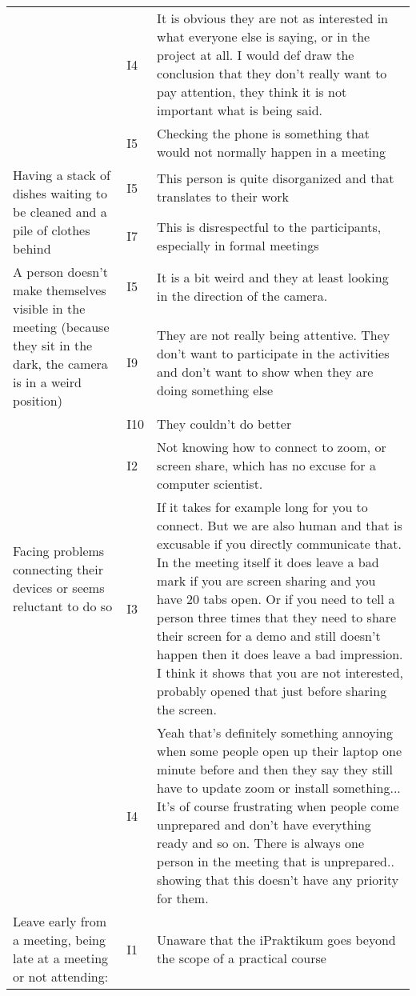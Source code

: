 \begin{longtable}[ht]{ p{}   p{}  p{} }
    & I4 & It is obvious they are not as interested in what everyone else is saying, or in the project at all. I would def draw the conclusion that they don't really want to pay attention, they think it is not important what is being said. \\
 	& I5 & Checking the phone is something that would not normally happen in a meeting \\
    \hline
    \multirow{2}{4cm}{Having a stack of dishes waiting to be cleaned and a pile of clothes behind} & I5 & This person is quite disorganized and that translates to their work \\
    & I7 & This is disrespectful to the participants, especially in formal meetings \\
    \hline
    \multirow{2}{4cm}{A person doesn’t make themselves visible in the meeting (because they sit in the dark, the camera is in a weird position)} & I5 & It is a bit weird and they at least looking in the direction of the camera. \\
    & I9 & They are not really being attentive. They don’t want to participate in the activities and don’t want to show when they are doing something else\\
 	& I10 & They couldn’t do better \\
    \hline
    \multirow{2}{4cm}{Facing problems connecting their devices or seems reluctant to do so} 
    & I2 & Not knowing how to connect to zoom, or screen share, which has no excuse for a computer scientist. \\
    & I3 & If it takes for example long for you to connect. But we are also human and that is excusable if you directly communicate that. In the meeting itself it does leave a bad mark if you are screen sharing and you have 20 tabs open. Or if you need to tell a person three times that they need to share their screen for a demo and still doesn't happen then it does leave a bad impression. I think it shows that you are not interested, probably opened that just before sharing the screen. \\
    & I4 & Yeah that's definitely something annoying when some people open up their laptop one minute before and then they say they still have to update zoom or install something... It's of course frustrating when people come unprepared and don't have everything ready and so on. There is always one person in the meeting that is unprepared.. showing that this doesn't have any priority for them. \\
    \hline
     \multirow{2}{4cm}{Leave early from a meeting, being late at a meeting or not attending:} & I1 & Unaware that the iPraktikum goes beyond the scope of a practical course \\

\end{longtable}
